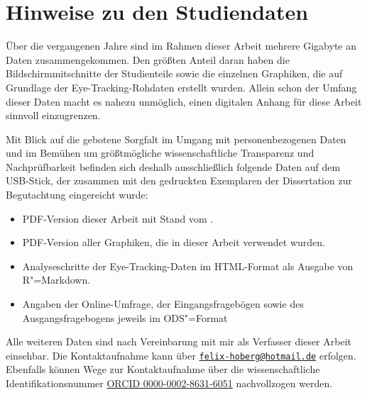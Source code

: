 
\chapter{Hinweise zu den Studiendaten} %

\label{App5:Hinweise} %

Über die vergangenen Jahre sind im Rahmen dieser Arbeit mehrere Gigabyte an Daten zusammengekommen. Den größten Anteil daran haben die Bildschirmmitschnitte der Studienteile sowie die einzelnen Graphiken, die auf Grundlage der Eye-Tracking-Rohdaten erstellt wurden. Allein schon der Umfang dieser Daten macht es nahezu unmöglich, einen digitalen Anhang für diese Arbeit sinnvoll einzugrenzen.

Mit Blick auf die gebotene Sorgfalt im Umgang mit personenbezogenen Daten und im Bemühen um größtmögliche wissenschaftliche Transparenz und Nachprüfbarkeit befinden sich deshalb ausschließlich folgende Daten auf dem USB-Stick, der zusammen mit den gedruckten Exemplaren der Dissertation zur Begutachtung eingereicht wurde:

\begin{itemize}
    \item PDF-Version dieser Arbeit mit Stand vom \datumFinal{}.
    
    \item PDF-Version aller Graphiken, die in dieser Arbeit verwendet wurden.
    
    \item Analyseschritte der Eye-Tracking-Daten im HTML-Format als Ausgabe von R"=Markdown.
    
    \item Angaben der Online-Umfrage, der Eingangsfragebögen sowie des Ausgangsfragebogens jeweils im ODS"=Format
\end{itemize}

Alle weiteren Daten sind nach Vereinbarung mit mir als Verfasser dieser Arbeit einsehbar. Die Kontaktaufnahme kann über \texttt{\href{mailto:felix-hoberg@hotmail.de}{felix-hoberg@hotmail.de}} erfolgen. Ebenfalls können Wege zur Kontaktaufnahme über die wissenschaftliche Identifikationsnummer \href{https://orcid.org/0000-0002-8631-6051}{ORCID 0000-0002-8631-6051} nachvollzogen werden.